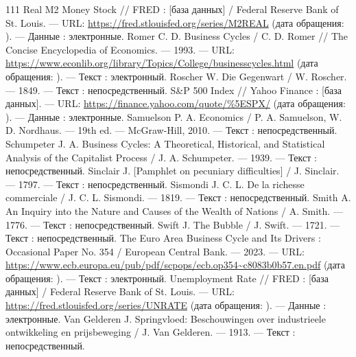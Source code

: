 \begin{RaggedRight}
\begin{thebibliography}{111}
     \hypertarget{bib:FRED-M2REAL}{} Real M2 Money Stock // FRED : [база данных] / Federal Reserve Bank of St. Louis. --- URL: \url{https://fred.stlouisfed.org/series/M2REAL} (дата обращения: \bibaccessdate). --- Данные : электронные.
     \hypertarget{bib:Romer-1993}{} Romer C. D. Business Cycles / C. D. Romer // The Concise Encyclopedia of Economics. --- 1993. --- URL: \url{https://www.econlib.org/library/Topics/College/businesscycles.html} (дата обращения: \bibaccessdate). --- Текст : электронный.
     \hypertarget{bib:Roscher-1849}{} Roscher W. Die Gegenwart / W. Roscher. --- 1849. --- Текст : непосредственный.
     \hypertarget{bib:SP500}{} S\&P 500 Index // Yahoo Finance : [база данных]. --- URL: \url{https://finance.yahoo.com/quote/%5ESPX/} (дата обращения: \bibaccessdate). --- Данные : электронные.
     \hypertarget{bib:Samuelson-2010}{} Samuelson P. A. Economics / P. A. Samuelson, W. D. Nordhaus. --- 19th ed. --- McGraw-Hill, 2010. --- Текст : непосредственный.
     \hypertarget{bib:Schumpeter-1939}{} Schumpeter J. A. Business Cycles: A Theoretical, Historical, and Statistical Analysis of the Capitalist Process / J. A. Schumpeter. --- 1939. --- Текст : непосредственный.
     \hypertarget{bib:Sinclair-1797}{} Sinclair J. [Pamphlet on pecuniary difficulties] / J. Sinclair. --- 1797. --- Текст : непосредственный.
     \hypertarget{bib:Sismondi-1819}{} Sismondi J. C. L. De la richesse commerciale / J. C. L. Sismondi. --- 1819. --- Текст : непосредственный.
     \hypertarget{bib:Smith-1776}{} Smith A. An Inquiry into the Nature and Causes of the Wealth of Nations / A. Smith. --- 1776. --- Текст : непосредственный.
     \hypertarget{bib:Swift-1721}{} Swift J. The Bubble / J. Swift. --- 1721. --- Текст : непосредственный.
     \hypertarget{bib:ECB-2023}{} The Euro Area Business Cycle and Its Drivers : Occasional Paper No. 354 / European Central Bank. --- 2023. --- URL: \url{https://www.ecb.europa.eu/pub/pdf/scpops/ecb.op354~c8083b0b57.en.pdf} (дата обращения: \bibaccessdate). --- Текст : электронный.
     \hypertarget{bib:FRED-UNRATE}{} Unemployment Rate // FRED : [база данных] / Federal Reserve Bank of St. Louis. --- URL: \url{https://fred.stlouisfed.org/series/UNRATE} (дата обращения: \bibaccessdate). --- Данные : электронные.
     \hypertarget{bib:Van-Gelderen-1913}{} Van Gelderen J. Springvloed: Beschouwingen over industrieele ontwikkeling en prijsbeweging / J. Van Gelderen. --- 1913. --- Текст : непосредственный.

\end{thebibliography}
\end{RaggedRight}
